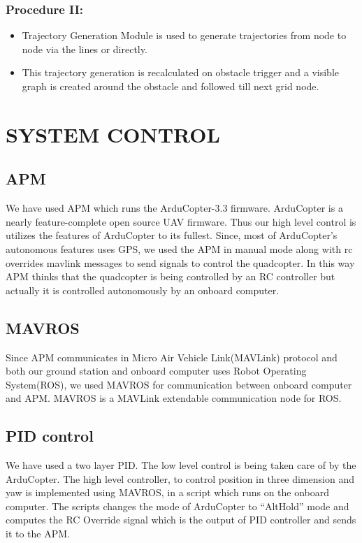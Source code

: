 \documentclass[12pt]{article}
\begin{document}
        \subsubsection*{Procedure II:}
            \begin{itemize}
                \item Trajectory Generation Module is used to generate trajectories from node to node via the lines or directly.
                \item This trajectory generation is recalculated on obstacle trigger and a visible graph is created around the obstacle and followed till next grid node.
            \end{itemize}

\section{SYSTEM CONTROL}
\subsection{APM}
    We have used APM which runs the ArduCopter-3.3 firmware. ArduCopter is a nearly feature-complete open source UAV firmware. Thus our high level control is utilizes the features of ArduCopter to its fullest. Since, most of ArduCopter’s autonomous features uses GPS, we used the APM in manual mode along with rc overrides mavlink messages to send signals to control the quadcopter. In this way APM thinks that the quadcopter is being controlled by an RC controller but actually it is controlled autonomously by an onboard computer.
    
\subsection{MAVROS}
    Since APM communicates in Micro Air Vehicle Link(MAVLink) protocol and both our ground station and onboard computer uses Robot Operating System(ROS), we used MAVROS for communication between onboard computer and APM. MAVROS is a MAVLink extendable communication node for ROS.
    
    
\subsection{PID control}
    We have used a two layer PID. The low level control is being taken care of by the ArduCopter. The high level controller, to control position in three dimension and yaw is implemented using MAVROS, in a script which runs on the onboard computer. The scripts changes the mode of ArduCopter to “AltHold” mode and computes the RC Override signal which is the output of PID controller and sends it to the APM.
\end{document}

